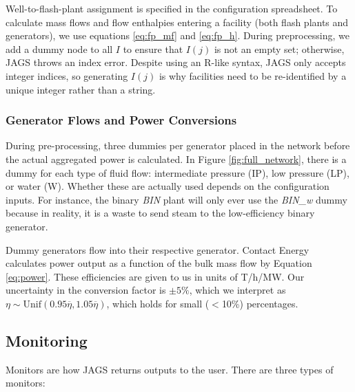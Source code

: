 \documentclass[a4paper, 12pt]{article}
\begin{document}
\begin{figure}
\begin{minipage}[t]{.48\textwidth}
  \label{fig:production_curve}
\end{minipage}
\end{figure}

Well-to-flash-plant assignment is specified in the configuration spreadsheet. To calculate mass flows and flow enthalpies entering a facility (both flash plants and generators), we use equations \ref{eq:fp_mf} and \ref{eq:fp_h}. During preprocessing, we add a dummy node to all $I$ to ensure that $I(j)$ is not an empty set; otherwise, JAGS throws an index error. Despite using an R-like syntax, JAGS only accepts integer indices, so generating $I(j)$ is why facilities need to be re-identified by a unique integer rather than a string. 

\subsubsection{Generator Flows and Power Conversions}
During pre-processing, three dummies per generator placed in the network before the actual aggregated power is calculated. In Figure \ref{fig:full_network}, there is a dummy for each type of fluid flow: intermediate pressure (IP), low pressure (LP), or water (W). Whether these are actually used depends on the configuration inputs. For instance, the binary \emph{BIN} plant will only ever use the \emph{BIN\_w} dummy because in reality, it is a waste to send steam to the low-efficiency binary generator.

Dummy generators flow into their respective generator. Contact Energy calculates power output as a function of the bulk mass flow by Equation \ref{eq:power}. These efficiencies are given to us in units of T/h/MW. Our uncertainty in the conversion factor is $\pm5\%$, which we interpret as $\eta \sim \text{Unif}\left( 0.95\overline\eta, 1.05\overline\eta \right)$, which holds for small ($<$10\%) percentages.

\subsection{Monitoring}

Monitors are how JAGS returns outputs to the user. There are three types of monitors:
\end{document}
